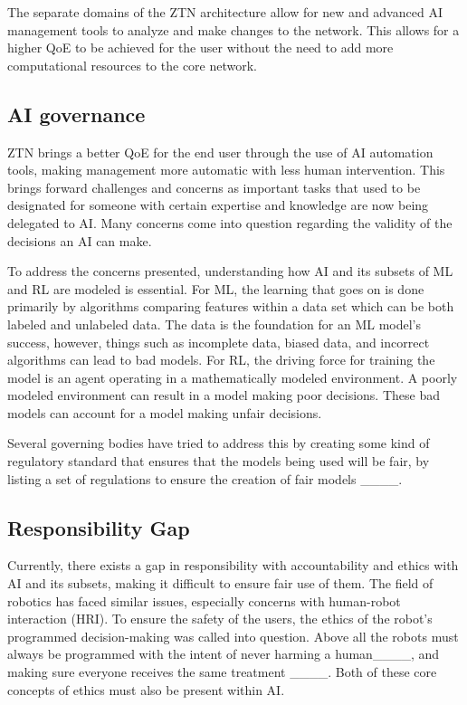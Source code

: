 The separate domains of the ZTN architecture allow for new and advanced AI management tools to analyze and make changes to the network. This allows for a higher QoE to be achieved for the user without the need to add more computational resources to the core network. 

\subsection {AI governance}

ZTN brings a better QoE for the end user through the use of AI automation tools, making management more automatic with less human intervention. This brings forward challenges and concerns as important tasks that used to be designated for someone with certain expertise and knowledge are now being delegated to AI. Many concerns come into question regarding the validity of the decisions an AI can make.

To address the concerns presented, understanding how AI and its subsets of ML and RL are modeled is essential. For ML, the learning that goes on is done primarily by algorithms comparing features within a data set which can be both labeled and unlabeled data. The data is the foundation for an ML model's success, however, things such as incomplete data, biased data, and incorrect algorithms can lead to bad models. For RL, the driving force for training the model is an agent operating in a mathematically modeled environment. A poorly modeled environment can result in a model making poor decisions. These bad models can account for a model making unfair decisions.


Several governing bodies have tried to address this by creating some kind of regulatory standard that ensures that the models being used will be fair, by listing a set of regulations to ensure the creation of fair models ____.



\subsection{Responsibility Gap}


Currently, there exists a gap in responsibility with accountability and ethics with AI and its subsets, making it difficult to ensure fair use of them. The field of robotics has faced similar issues, especially concerns with human-robot interaction (HRI). To ensure the safety of the users, the ethics of the robot's programmed decision-making was called into question. Above all the robots must always be programmed with the intent of never harming a human____, and making sure everyone receives the same treatment ____. Both of these core concepts of ethics must also be present within AI.